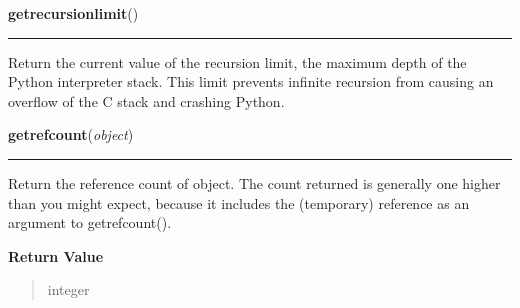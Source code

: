     \label{sys:getrecursionlimit}

    \vspace{0.5ex}

\hspace{.8\funcindent}\begin{boxedminipage}{\funcwidth}

    \raggedright \textbf{getrecursionlimit}()

    \vspace{-1.5ex}

    \rule{\textwidth}{0.5\fboxrule}
\setlength{\parskip}{2ex}
    Return the current value of the recursion limit, the maximum depth of 
    the Python interpreter stack.  This limit prevents infinite recursion 
    from causing an overflow of the C stack and crashing Python.

\setlength{\parskip}{1ex}
    \end{boxedminipage}

    \label{sys:getrefcount}

    \vspace{0.5ex}

\hspace{.8\funcindent}\begin{boxedminipage}{\funcwidth}

    \raggedright \textbf{getrefcount}(\textit{object})

    \vspace{-1.5ex}

    \rule{\textwidth}{0.5\fboxrule}
\setlength{\parskip}{2ex}
    Return the reference count of object.  The count returned is generally 
    one higher than you might expect, because it includes the (temporary) 
    reference as an argument to getrefcount().

\setlength{\parskip}{1ex}
      \textbf{Return Value}
    \vspace{-1ex}

      \begin{quote}
      integer

      \end{quote}

    \end{boxedminipage}

    \label{sys:getsizeof}

    \vspace{0.5ex}

